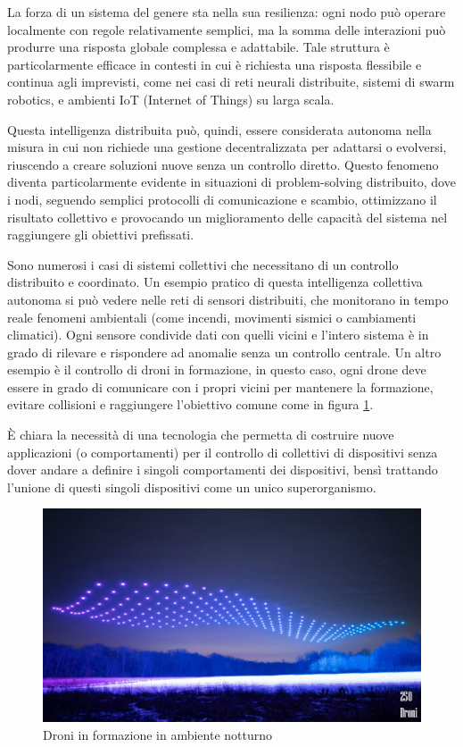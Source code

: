 \documentclass[12pt,a4paper,openright,twoside]{book}
\begin{document}
La forza di un sistema del genere sta nella sua resilienza: ogni nodo può operare localmente con regole relativamente semplici, ma la somma delle interazioni può produrre una risposta globale complessa e adattabile. Tale struttura è particolarmente efficace in contesti in cui è richiesta una risposta flessibile e continua agli imprevisti, come nei casi di reti neurali distribuite, sistemi di swarm robotics, e ambienti IoT (Internet of Things) su larga scala.

Questa intelligenza distribuita può, quindi, essere considerata autonoma nella misura in cui non richiede una gestione decentralizzata per adattarsi o evolversi, riuscendo a creare soluzioni nuove senza un controllo diretto. Questo fenomeno diventa particolarmente evidente in situazioni di problem-solving distribuito, dove i nodi, seguendo semplici protocolli di comunicazione e scambio, ottimizzano il risultato collettivo e provocando un miglioramento delle capacità del sistema nel raggiungere gli obiettivi prefissati.

Sono numerosi i casi di sistemi collettivi che necessitano di un controllo distribuito e coordinato. Un esempio pratico di questa intelligenza collettiva autonoma si può vedere nelle reti di sensori distribuiti, che monitorano in tempo reale fenomeni ambientali (come incendi, movimenti sismici o cambiamenti climatici). Ogni sensore condivide dati con quelli vicini e l'intero sistema è in grado di rilevare e rispondere ad anomalie senza un controllo centrale. Un altro esempio è il controllo di droni in formazione, in questo caso, ogni drone deve essere in grado di comunicare con i propri vicini per mantenere la formazione, evitare collisioni e raggiungere l'obiettivo comune come in figura \ref{fig:drones}.

È chiara la necessità di una tecnologia che permetta di costruire nuove applicazioni (o comportamenti) per il controllo di collettivi di dispositivi senza dover andare a definire i singoli comportamenti dei dispositivi, bensì trattando l'unione di questi singoli dispositivi come un unico superorganismo.

\begin{figure}
    \centering
    \includegraphics[width=.7\linewidth]{figures/drones.jpg}
    \caption{Droni in formazione in ambiente notturno}
    \label{fig:drones}
\end{figure}
\end{document}
